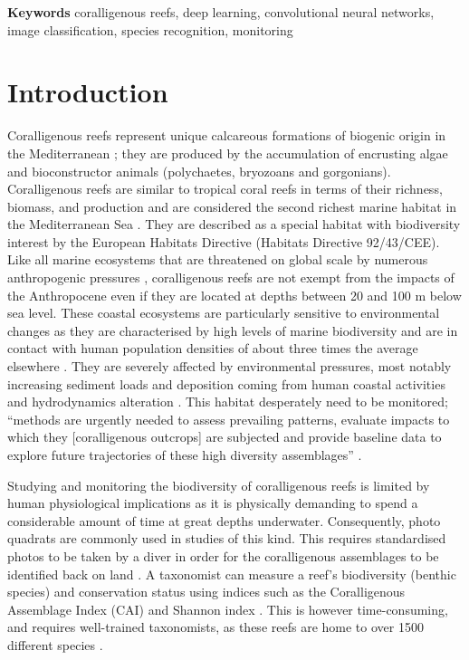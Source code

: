 \noindent\textbf{Keywords}
coralligenous reefs, deep learning, convolutional neural networks, image classification, species recognition, monitoring

\section{Introduction}\label{chapitre1_1}
Coralligenous reefs represent unique calcareous formations of biogenic origin in the Mediterranean \citep{ballesteros_mediterranean_2006}; they are produced by the accumulation of encrusting algae and bioconstructor animals (polychaetes, bryozoans and gorgonians). Coralligenous reefs are similar to tropical coral reefs in terms of their richness, biomass, and production \citep{bianchi_biocostruzione_2001} and are considered the second richest marine habitat in the Mediterranean Sea \citep{boudouresque_marine_2004}. They are described as a special habitat with biodiversity interest by the European Habitats Directive (Habitats Directive 92/43/CEE). Like all marine ecosystems that are threatened on global scale by numerous anthropogenic pressures \citep{halpern_global_2008, hoekstra_confronting_2004}, coralligenous reefs are not exempt from the impacts of the Anthropocene \citep{mcgill_fifteen_2015} even if they are located at depths between 20 and 100 m below sea level. These coastal ecosystems are particularly sensitive to environmental changes as they are characterised by high levels of marine biodiversity \citep{halpern_global_2008} and are in contact with human population densities of about three times the average elsewhere \citep{small_global_2003}. They are severely affected by environmental pressures, most notably increasing sediment loads and deposition coming from human coastal activities and hydrodynamics alteration \citep{airoldi_effects_2003, ballesteros_mediterranean_2006}. This habitat desperately need to be monitored; “methods are urgently needed to assess prevailing patterns, evaluate impacts to which they [coralligenous outcrops] are subjected and provide baseline data to explore future trajectories of these high diversity assemblages” \citep{kipson_rapid_2011}.

Studying and monitoring the biodiversity of coralligenous reefs is limited by human physiological implications as it is physically demanding to spend a considerable amount of time at great depths underwater. Consequently, photo quadrats are commonly used in studies of this kind. This requires standardised photos to be taken by a diver in order for the coralligenous assemblages to be identified back on land \citep{deter_rapid_2012}. A taxonomist can measure a reef’s biodiversity (benthic species) and conservation status using indices such as the Coralligenous Assemblage Index (CAI) \citep{deter_preliminary_2012} and Shannon index \citep{magurran_measuring_2004}. This is however time-consuming, and requires well-trained taxonomists, as these reefs are home to over 1500 different species \citep{ballesteros_mediterranean_2006}. 


